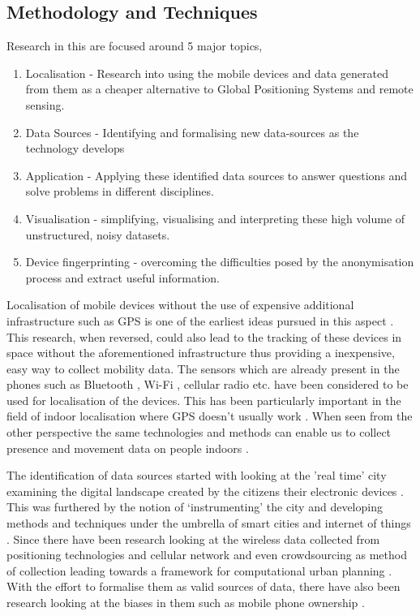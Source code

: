 \subsection{Methodology and Techniques}

Research in this are focused around 5 major topics,

\begin{enumerate}[rightmargin=2em, leftmargin=2em]
  \itemsep-0.25em
  \item Localisation - Research into using the mobile devices and data generated from them as a cheaper alternative to Global Positioning Systems and remote sensing.
  \item Data Sources - Identifying and formalising new data-sources as the technology develops
  \item Application - Applying these identified data sources to answer questions and solve problems in different disciplines.
  \item Visualisation - simplifying, visualising and interpreting these high volume of unstructured, noisy datasets.
  \item Device fingerprinting - overcoming the difficulties posed by the anonymisation process and extract useful information.
\end{enumerate}

Localisation of mobile devices without the use of expensive additional infrastructure such as GPS is one of the earliest ideas pursued in this aspect \citep{bulusu2000, he2003, moore2004, lamarca2005}.
This research, when reversed, could also lead to the tracking of these devices in space without the aforementioned infrastructure thus providing a inexpensive, easy way to collect mobility data.
The sensors which are already present in the phones such as Bluetooth \citep{bandara2004}, Wi-Fi \citep{zarim2006}, cellular radio \citep{dil2011, ahas2005} etc. have been considered to be used for localisation of the devices.
This has been particularly important in the field of indoor localisation where GPS doesn't usually work \cite{kawaguchi2009}.
When seen from the other perspective the same technologies and methods can enable us to collect presence and movement data on people indoors \citep{roy2018a, roy2018b, jia2019, nikitin2019}.

The identification of data sources started with looking at the 'real time' city examining the digital landscape created by the citizens their electronic devices \citep{townsend2000}.
This was furthered by the notion of `instrumenting' the city and developing methods and techniques under the umbrella of smart cities and internet of things \citep{oneill2006}.
Since there have been research looking at the wireless data collected from positioning technologies \citep{bensky2007} and cellular network \citep{kiukkonen2010, steenbruggen2015} and even crowdsourcing as method of collection \citep{shin2013} leading towards a framework for computational urban planning \citep{kontokosta2015}.
With the effort to formalise them as valid sources of data, there have also been research looking at the biases in them such as mobile phone ownership \citep{wesolowski2013, kobus2013}.

